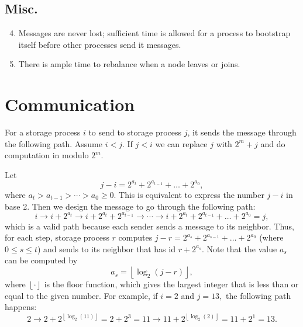 \documentclass[11pt]{article}
\begin{document}
\subsection{Misc.}
\begin{enumerate}[\text{A}1]
\setcounter{enumi}{3}
\item \label{A:message_never_lost} Messages are never lost; sufficient time is allowed for a process to bootstrap itself before other processes send it messages.
\item There is ample time to rebalance when a node leaves or joins.
\end{enumerate}


\section{Communication}
For a storage process $i$ to send to storage process $j$, it sends 
the message through the following path. Assume $i < j$. If $j < i$ we can replace $j$ with $2^m + j$ and do computation in modulo $2^m.$

Let
\[
    j - i = 2^{a_t} + 2^{a_{t - 1}} + \ldots + 2^{a_0},
\]
where $a_t > a_{t - 1} > \cdots > a_0 \geq 0.$ This is equivalent to express the number $j - i$ in base 2. Then we design the message to go through the following path:
\[
    i \longrightarrow i + 2^{a_t} \longrightarrow i + 2^{a_t} + 2^{a_{t - 1}} \longrightarrow \cdots \longrightarrow 
    i + 2^{a_t} + 2^{a_{t - 1}} + \ldots + 2^{a_0} = j,
\]
which is a valid path because each sender sends a message to its neighbor. Thus, for each step, storage process $r$ computes $j - r = 2^{a_s} + 2^{a_{s-1}} + \ldots + 2^{a_0}$ (where $0\leq s \leq t$) and sends to its neighbor that has id $r + 2^{a_s}$. Note that the value $a_s$ can be computed by
\[
    a_s = \left\lfloor \log_2(j - r) \right\rfloor,
\]
where $\left\lfloor \cdot \right\rfloor$ is the floor function, which gives the largest integer that is less than or equal to the given number. For example, if $i = 2$ and $j = 13,$ the following path happens:
\[
    2 \longrightarrow 2 + 2^{\left\lfloor \log_2(11) \right\rfloor} = 2 + 2^3 = 11  \longrightarrow 11 + 2^{\left\lfloor \log_2(2) \right\rfloor} = 11 + 2^1 = 13.
\]

\end{document}
